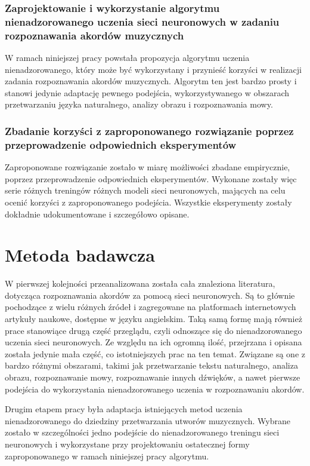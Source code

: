 \subsubsection{Zaprojektowanie i wykorzystanie algorytmu nienadzorowanego uczenia sieci neuronowych w zadaniu rozpoznawania akordów muzycznych}

W ramach niniejszej pracy powstała propozycja algorytmu uczenia nienadzorowanego, który może być wykorzystany i przynieść korzyści w realizacji zadania rozpoznawania akordów muzycznych. Algorytm ten jest bardzo prosty i stanowi jedynie adaptację pewnego podejścia, wykorzystywanego w obszarach przetwarzaniu języka naturalnego, analizy obrazu i rozpoznawania mowy.

\subsubsection{Zbadanie korzyści z zaproponowanego rozwiązanie poprzez przeprowadzenie odpowiednich eksperymentów}

Zaproponowane rozwiązanie zostało w miarę możliwości zbadane empirycznie, poprzez przeprowadzenie odpowiednich eksperymentów. Wykonane zostały więc serie różnych treningów różnych modeli sieci neuronowych, mających na celu ocenić korzyści z zaproponowanego podejścia. Wszystkie eksperymenty zostały dokładnie udokumentowane i szczegółowo opisane.



\section{Metoda badawcza}

W pierwszej kolejności przeanalizowana została cała znaleziona literatura, dotycząca rozpoznawania akordów za pomocą sieci neuronowych. Są to głównie pochodzące z wielu różnych źródeł i zagregowane na platformach internetowych artykuły naukowe, dostępne w języku angielskim. Taką samą formę mają również prace stanowiące drugą część przeglądu, czyli odnoszące się do nienadzorowanego uczenia sieci neuronowych. Ze względu na ich ogromną ilość, przejrzana i opisana została jedynie mała część, co istotniejszych prac na ten temat. Związane są one z bardzo różnymi obszarami, takimi jak przetwarzanie tekstu naturalnego, analiza obrazu, rozpoznawanie mowy, rozpoznawanie innych dźwięków, a nawet pierwsze podejścia do wykorzystania nienadzorowanego uczenia w rozpoznawaniu akordów.

Drugim etapem pracy była adaptacja istniejących metod uczenia nienadzorowanego do dziedziny przetwarzania utworów muzycznych. Wybrane zostało w szczególności jedno podejście do nienadzorowanego treningu sieci neuronowych i wykorzystane przy projektowaniu ostatecznej formy zaproponowanego w ramach niniejszej pracy algorytmu.

